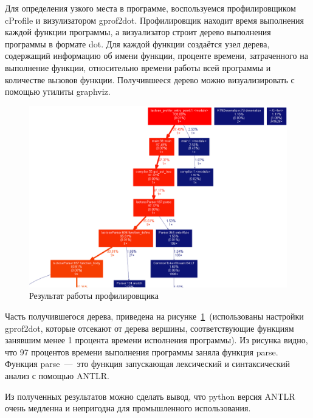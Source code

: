 \documentclass[12pt,a4paper,oneside]{extarticle}
\begin{document}
        Для определения узкого места в программе, воспользуемся профилировщиком cProfile и визулизатором gprof2dot.
        Профилировщик находит время выполнения каждой функции программы, а визуализатор строит дерево выполнения программы в формате dot.
        Для каждой функции создаётся узел дерева, содержащий информацию об имени функции, проценте времени, затраченного на выполнение функции, относительно времени работы всей программы и количестве вызовов функции.
        Получившееся дерево можно визуализировать с помощью утилиты graphviz.

        \begin{figure}[h!]
            \center
            \includegraphics[scale=0.45]{lactose_stats.png}
            \caption{Результат работы профилировщика}
            \label{pic:stats}
        \end{figure}

        Часть получившегося дерева, приведена на рисунке~\ref{pic:stats}~(использованы настройки gprof2dot, которые отсекают от дерева вершины, соответствующие функциям занявшим менее 1 процента времени исполнения программы).
        Из рисунка видно, что 97 процентов времени выполнения программы заняла функция parse. Функция parse~---~это функция запускающая лексический и синтаксический анализ с помощью ANTLR.

        Из полученных результатов можно сделать вывод, что python версия ANTLR очень медленна и непригодна для промышленного использования.
    
\end{document}
